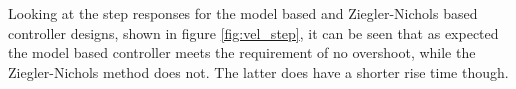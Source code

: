 \documentclass[../../main.tex]{subfiles}
\begin{document}

Looking at the step responses for the model based and Ziegler-Nichols based controller designs, shown in figure \ref{fig:vel_step}, it can be seen that as expected the model based controller meets the requirement of no overshoot, while the Ziegler-Nichols method does not. The latter does have a shorter rise time though.



\end{document}
